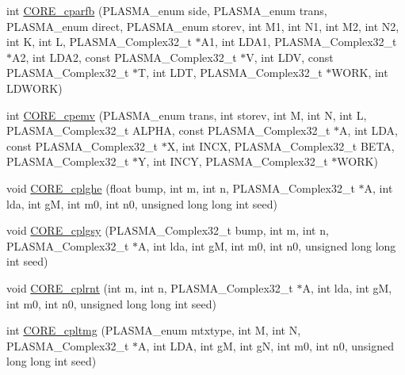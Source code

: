 \begin{DoxyCompactItemize}
\item 
int \hyperlink{group__CORE__PLASMA__Complex32__t_ga450824a3da3b8be57d1f1640cd975328_ga450824a3da3b8be57d1f1640cd975328}{C\+O\+R\+E\+\_\+cparfb} (P\+L\+A\+S\+M\+A\+\_\+enum side, P\+L\+A\+S\+M\+A\+\_\+enum trans, P\+L\+A\+S\+M\+A\+\_\+enum direct, P\+L\+A\+S\+M\+A\+\_\+enum storev, int M1, int N1, int M2, int N2, int K, int L, P\+L\+A\+S\+M\+A\+\_\+\+Complex32\+\_\+t $\ast$A1, int L\+D\+A1, P\+L\+A\+S\+M\+A\+\_\+\+Complex32\+\_\+t $\ast$A2, int L\+D\+A2, const P\+L\+A\+S\+M\+A\+\_\+\+Complex32\+\_\+t $\ast$V, int L\+D\+V, const P\+L\+A\+S\+M\+A\+\_\+\+Complex32\+\_\+t $\ast$T, int L\+D\+T, P\+L\+A\+S\+M\+A\+\_\+\+Complex32\+\_\+t $\ast$W\+O\+R\+K, int L\+D\+W\+O\+R\+K)
\item 
int \hyperlink{group__CORE__PLASMA__Complex32__t_ga3b6583c1a567beb3f5245b86a78c6075_ga3b6583c1a567beb3f5245b86a78c6075}{C\+O\+R\+E\+\_\+cpemv} (P\+L\+A\+S\+M\+A\+\_\+enum trans, int storev, int M, int N, int L, P\+L\+A\+S\+M\+A\+\_\+\+Complex32\+\_\+t A\+L\+P\+H\+A, const P\+L\+A\+S\+M\+A\+\_\+\+Complex32\+\_\+t $\ast$A, int L\+D\+A, const P\+L\+A\+S\+M\+A\+\_\+\+Complex32\+\_\+t $\ast$X, int I\+N\+C\+X, P\+L\+A\+S\+M\+A\+\_\+\+Complex32\+\_\+t B\+E\+T\+A, P\+L\+A\+S\+M\+A\+\_\+\+Complex32\+\_\+t $\ast$Y, int I\+N\+C\+Y, P\+L\+A\+S\+M\+A\+\_\+\+Complex32\+\_\+t $\ast$W\+O\+R\+K)
\item 
void \hyperlink{group__CORE__PLASMA__Complex32__t_ga7a8e1da6cc07180d0ff5fd4d01782121_ga7a8e1da6cc07180d0ff5fd4d01782121}{C\+O\+R\+E\+\_\+cplghe} (float bump, int m, int n, P\+L\+A\+S\+M\+A\+\_\+\+Complex32\+\_\+t $\ast$A, int lda, int g\+M, int m0, int n0, unsigned long long int seed)
\item 
void \hyperlink{group__CORE__PLASMA__Complex32__t_gae322390ce2e35aadcda2acacecd7cc9b_gae322390ce2e35aadcda2acacecd7cc9b}{C\+O\+R\+E\+\_\+cplgsy} (P\+L\+A\+S\+M\+A\+\_\+\+Complex32\+\_\+t bump, int m, int n, P\+L\+A\+S\+M\+A\+\_\+\+Complex32\+\_\+t $\ast$A, int lda, int g\+M, int m0, int n0, unsigned long long int seed)
\item 
void \hyperlink{group__CORE__PLASMA__Complex32__t_ga7ae8308bfdf4f12a4b07edacf0b9b4a7_ga7ae8308bfdf4f12a4b07edacf0b9b4a7}{C\+O\+R\+E\+\_\+cplrnt} (int m, int n, P\+L\+A\+S\+M\+A\+\_\+\+Complex32\+\_\+t $\ast$A, int lda, int g\+M, int m0, int n0, unsigned long long int seed)
\item 
int \hyperlink{group__CORE__PLASMA__Complex32__t_ga7fe65a820c911adce00227a128567766_ga7fe65a820c911adce00227a128567766}{C\+O\+R\+E\+\_\+cpltmg} (P\+L\+A\+S\+M\+A\+\_\+enum mtxtype, int M, int N, P\+L\+A\+S\+M\+A\+\_\+\+Complex32\+\_\+t $\ast$A, int L\+D\+A, int g\+M, int g\+N, int m0, int n0, unsigned long long int seed)

\end{DoxyCompactItemize}

